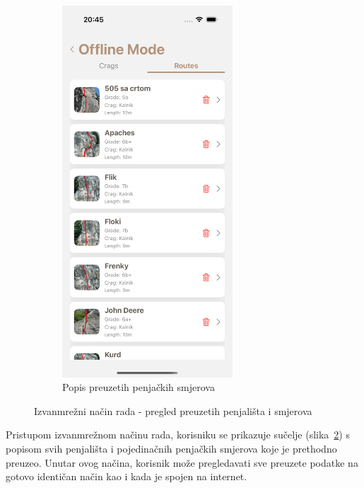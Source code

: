 \begin{figure}[H]
\begin{subfigure}[b]{0.4\textwidth}
        \includegraphics[width=0.7\textwidth]{images/implementacija/offline-mode/routes-tab.png}
        \caption{Popis preuzetih penjačkih smjerova}
        \label{fig:offline_routes_tab}
    \end{subfigure}
    \caption{Izvanmrežni način rada - pregled preuzetih penjališta i smjerova}
    \label{fig:izvanmrezni_nacin_rada}
\end{figure}

Pristupom izvanmrežnom načinu rada, korisniku se prikazuje sučelje (slika~\ref{fig:izvanmrezni_nacin_rada}) s popisom svih penjališta i pojedinačnih penjačkih smjerova koje je prethodno preuzeo. Unutar ovog načina, korisnik može pregledavati sve preuzete podatke na gotovo identičan način kao i kada je spojen na internet. 

